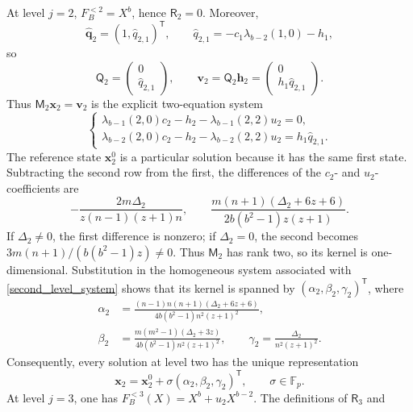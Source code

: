\documentclass[12pt]{article}
\theoremstyle{remark}
\newcommand{\F}{\mathbb{F}_p}
\begin{document}
At level $j=2$, $F_B^{<2}=X^b$, hence $\mathsf R_2=0$.  Moreover,
\[
 \widehat{\mathbf q}_2=(1,\widehat q_{2,1})^{\mathsf T},\qquad
 \widehat q_{2,1}=-c_1\lambda_{b-2}(1,0)-h_1,
\]
so
\[
 \mathsf Q_2=
 \begin{pmatrix}0\\ \widehat q_{2,1}\end{pmatrix},\qquad
 \mathbf v_2=\mathsf Q_2\mathbf h_2
 =\begin{pmatrix}0\\ h_1\widehat q_{2,1}\end{pmatrix}.
\]
Thus $\mathsf M_2\mathbf x_2=\mathbf v_2$ is the explicit two-equation
system
\begin{equation}\label{second_level_system}
\begin{cases}
 \lambda_{b-1}(2,0)c_2-h_2-\lambda_{b-1}(2,2)u_2=0,\\
 \lambda_{b-2}(2,0)c_2-h_2-\lambda_{b-2}(2,2)u_2
      =h_1\widehat q_{2,1}.
\end{cases}
\end{equation}
The reference state $\mathbf x_2^0$ is a particular solution because
it has the same first state.  Subtracting the second row from the first,
the differences of the $c_2$- and $u_2$-coefficients are
\[
 -\frac{2m\Delta_2}{z(n-1)(z+1)n},\qquad
 \frac{m(n+1)(\Delta_2+6z+6)}{2b(b^2-1)z(z+1)}.
\]
If $\Delta_2\ne0$, the first difference is nonzero; if
$\Delta_2=0$, the second becomes
$3m(n+1)/(b(b^2-1)z)\ne0$.  Thus $\mathsf M_2$ has rank two, so its kernel is
one-dimensional.  Substitution in the homogeneous system associated with
\eqref{second_level_system} shows that its kernel is spanned by
$(\alpha_2,\beta_2,\gamma_2)^{\mathsf T}$, where
\begin{equation}\label{alpha2beta2}
\begin{aligned}
 \alpha_2&=\frac{(n-1)n(n+1)(\Delta_2+6z+6)}
                  {4b(b^2-1)n^2(z+1)^2},\\
 \beta_2&=\frac{m(m^2-1)(\Delta_2+3z)}
                  {4b(b^2-1)n^2(z+1)^2},\qquad
 \gamma_2=\frac{\Delta_2}{n^2(z+1)^2}.
\end{aligned}
\end{equation}
Consequently, every solution at level two has the unique representation
\begin{equation}\label{mregsecond}
 \mathbf x_2=\mathbf x_2^0+
       \sigma(\alpha_2,\beta_2,\gamma_2)^{\mathsf T},
       \qquad \sigma\in\F.
\end{equation}
At level $j=3$, one has
$F_B^{<3}(X)=X^b+u_2X^{b-2}$.  The definitions of $\mathsf R_3$ and
\end{document}
